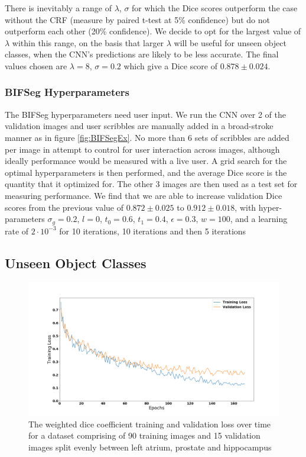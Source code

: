 There is inevitably a range of $\lambda$, $\sigma$ for which the Dice scores outperform the case without the CRF (measure by paired t-test at 5\% confidence) but do not outperform each other (20\% confidence). We decide to opt for the largest value of $\lambda$ within this range, on the basis that larger $\lambda$ will be useful for unseen object classes, when the CNN's predictions are likely to be less accurate. The final values chosen are $\lambda=8$, $\sigma=0.2$ which give a Dice score of $0.878 \pm 0.024$.

\subsubsection{BIFSeg Hyperparameters} \label{sec:BIFhyper}
The BIFSeg hyperparameters need user input. We run the CNN over 2 of the validation images and user scribbles are manually added in a broad-stroke manner as in figure \ref{fig:BIFSegEx}. No more than 6 sets of scribbles are added per image in attempt to control for user interaction across images, although ideally performance would be measured with a live user. A grid search for the optimal hyperparameters is then performed, and the average Dice score is the quantity that it optimized for. The other 3 images are then used as a test set for measuring performance. We find that we are able to increase validation Dice scores from the previous value of $0.872 \pm 0.025$ to $0.912 \pm 0.018$, with hyper-parameters $\sigma_g = 0.2$, $l=0$, $t_0=0.6$, $t_1=0.4$, $\epsilon=0.3$, $w=100$, and a learning rate of $2 \cdot 10^{-3}$ for 10 iterations, 10 iterations and then 5 iterations

\subsection{Unseen Object Classes}

\begin{figure}[h!]
\centering
\includegraphics[scale=0.25]{pictures/lossPlotGen}
\caption{The weighted dice coefficient training and validation loss over time for a dataset comprising of 90 training images and 15 validation images split evenly between left atrium, prostate and hippocampus}
\label{fig:lossGen}
\end{figure}


